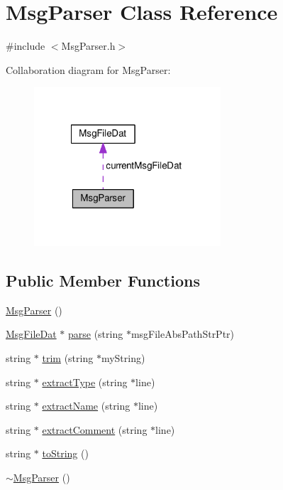 \hypertarget{class_msg_parser}{\section{Msg\-Parser Class Reference}
\label{class_msg_parser}
}


{\ttfamily \#include $<$Msg\-Parser.\-h$>$}



Collaboration diagram for Msg\-Parser\-:
\nopagebreak
\begin{figure}[H]
\begin{center}
\leavevmode
\includegraphics[width=197pt]{class_msg_parser__coll__graph}
\end{center}
\end{figure}
\subsection*{Public Member Functions}
\begin{DoxyCompactItemize}
\item 
\hyperlink{class_msg_parser_ab1e677e497e0e3872062dbb26d5d0d44}{Msg\-Parser} ()
\item 
\hyperlink{class_msg_file_dat}{Msg\-File\-Dat} $\ast$ \hyperlink{class_msg_parser_ae72b3fe9392b895129fd467861df2207}{parse} (string $\ast$msg\-File\-Abs\-Path\-Str\-Ptr)
\item 
string $\ast$ \hyperlink{class_msg_parser_a5d5b961a44665d5509753ba8b3905149}{trim} (string $\ast$my\-String)
\item 
string $\ast$ \hyperlink{class_msg_parser_a315c9b8c16fe487199abfae3c953155a}{extract\-Type} (string $\ast$line)
\item 
string $\ast$ \hyperlink{class_msg_parser_add6a7751c58dc76e77b4b8dfd4afebf8}{extract\-Name} (string $\ast$line)
\item 
string $\ast$ \hyperlink{class_msg_parser_af4f977684abaa8c2660f8ff0649d0557}{extract\-Comment} (string $\ast$line)
\item 
string $\ast$ \hyperlink{class_msg_parser_a3046f1fbf603a27dd255a0aa56c0c236}{to\-String} ()
\item 
\hyperlink{class_msg_parser_a936b164bb49dbfb69e4963d168569876}{$\sim$\-Msg\-Parser} ()
\end{DoxyCompactItemize}
